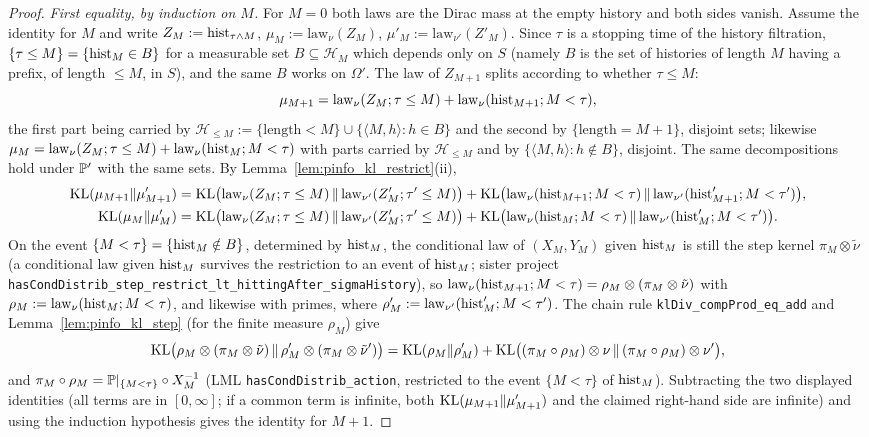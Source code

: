 \begin{proof}
\leanok
\emph{First equality, by induction on $M$.} For $M = 0$ both laws are the Dirac mass at the
empty history and both sides vanish. Assume the identity for $M$ and write
$Z_M := \mathrm{hist}_{\tau\wedge M}$, $\mu_M := \mathrm{law}_\nu(Z_M)$, $\mu'_M := \mathrm{law}_{\nu'}(Z'_M)$.
Since $\tau$ is a stopping time of the history filtration, $\{\tau \le M\} = \{\mathrm{hist}_M \in B\}$
for a measurable set $B \subseteq \mathcal H_M$ which depends only on $S$ (namely $B$ is the set of
histories of length $M$ having a prefix, of length $\le M$, in $S$), and the same $B$ works on
$\Omega'$. The law of $Z_{M+1}$ splits according to whether $\tau \le M$:
\[
  \mu_{M+1} = \mathrm{law}_\nu(Z_M ; \tau\le M) + \mathrm{law}_\nu(\mathrm{hist}_{M+1} ; M < \tau),
\]
the first part being carried by $\mathcal H_{\le M} := \{\text{length} < M\} \cup \{\langle M, h\rangle : h \in B\}$
and the second by $\{\text{length} = M + 1\}$, disjoint sets; likewise
$\mu_M = \mathrm{law}_\nu(Z_M ; \tau \le M) + \mathrm{law}_\nu(\mathrm{hist}_M ; M < \tau)$ with parts
carried by $\mathcal H_{\le M}$ and by $\{\langle M, h\rangle : h \notin B\}$, disjoint. The same
decompositions hold under $\mathbb{P}'$ with the same sets. By Lemma~\ref{lem:pinfo_kl_restrict}(ii),
\begin{align*}
  \mathrm{KL}(\mu_{M+1}\|\mu'_{M+1}) &= \mathrm{KL}\big(\mathrm{law}_\nu(Z_M;\tau\le M)\,\|\,\mathrm{law}_{\nu'}(Z'_M;\tau'\le M)\big)
     + \mathrm{KL}\big(\mathrm{law}_\nu(\mathrm{hist}_{M+1}; M<\tau)\,\|\,\mathrm{law}_{\nu'}(\mathrm{hist}'_{M+1}; M<\tau')\big),\\
  \mathrm{KL}(\mu_M\|\mu'_M) &= \mathrm{KL}\big(\mathrm{law}_\nu(Z_M;\tau\le M)\,\|\,\mathrm{law}_{\nu'}(Z'_M;\tau'\le M)\big)
     + \mathrm{KL}\big(\mathrm{law}_\nu(\mathrm{hist}_M; M<\tau)\,\|\,\mathrm{law}_{\nu'}(\mathrm{hist}'_M; M<\tau')\big).
\end{align*}
On the event $\{M < \tau\} = \{\mathrm{hist}_M \notin B\}$, determined by $\mathrm{hist}_M$, the conditional
law of $(X_M, Y_M)$ given $\mathrm{hist}_M$ is still the step kernel $\pi_M \otimes \tilde\nu$ (a
conditional law given $\mathrm{hist}_M$ survives the restriction to an event of $\mathrm{hist}_M$; sister
project \texttt{hasCondDistrib\_step\_restrict\_lt\_hittingAfter\_sigmaHistory}), so
$\mathrm{law}_\nu(\mathrm{hist}_{M+1}; M<\tau) = \rho_M \otimes (\pi_M\otimes\tilde\nu)$ with
$\rho_M := \mathrm{law}_\nu(\mathrm{hist}_M; M < \tau)$, and likewise with primes, where
$\rho'_M := \mathrm{law}_{\nu'}(\mathrm{hist}'_M; M<\tau')$. The chain rule \texttt{klDiv\_compProd\_eq\_add}
and Lemma~\ref{lem:pinfo_kl_step} (for the finite measure $\rho_M$) give
\[
  \mathrm{KL}\big(\rho_M\otimes(\pi_M\otimes\tilde\nu)\,\|\,\rho'_M\otimes(\pi_M\otimes\tilde\nu')\big)
  = \mathrm{KL}(\rho_M\|\rho'_M) + \mathrm{KL}\big((\pi_M\circ\rho_M)\otimes\nu\,\|\,(\pi_M\circ\rho_M)\otimes\nu'\big),
\]
and $\pi_M \circ \rho_M = \mathbb{P}|_{\{M<\tau\}}\circ X_M^{-1}$ (LML
\texttt{hasCondDistrib\_action}, restricted to the event $\{M < \tau\}$ of $\mathrm{hist}_M$).
Subtracting the two displayed identities (all terms are in $[0,\infty]$; if a common term is
infinite, both $\mathrm{KL}(\mu_{M+1}\|\mu'_{M+1})$ and the claimed right-hand side are infinite) and
using the induction hypothesis gives the identity for $M + 1$.


\end{proof}
